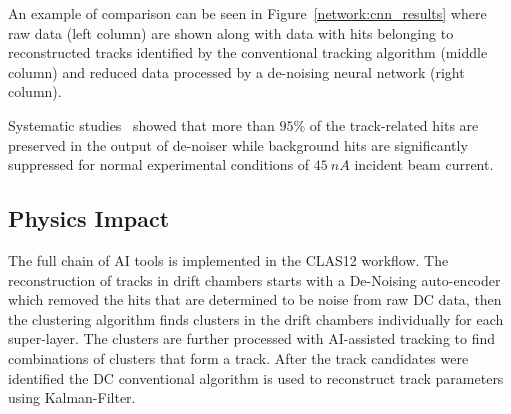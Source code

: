 \documentclass{webofc}
\begin{document}

An example of comparison can be seen in Figure~\ref{network:cnn_results} 
where raw data (left column) are shown along with data with hits belonging to reconstructed tracks 
identified by the conventional tracking algorithm (middle column) and 
reduced data processed by a de-noising neural network (right column).



Systematic studies~\cite{Thomadakis:2022zcd} showed that more than 
$95\%$ of the track-related hits are preserved in the output of de-noiser while 
background hits are significantly suppressed for normal experimental conditions of $45~nA$
incident beam current. 

\subsection{Physics Impact}
\label{denoising-physics-impact}

The full chain of AI tools is implemented in the CLAS12 workflow. The reconstruction of tracks in drift chambers
starts with a De-Noising auto-encoder which removed the hits that are determined to be noise from raw DC data,
then the clustering algorithm finds clusters in the drift chambers individually for each super-layer. The clusters are 
further processed with AI-assisted tracking to find combinations of clusters that form a track. After the track candidates 
were identified the DC conventional algorithm is used to reconstruct track parameters using Kalman-Filter.
\end{document}
